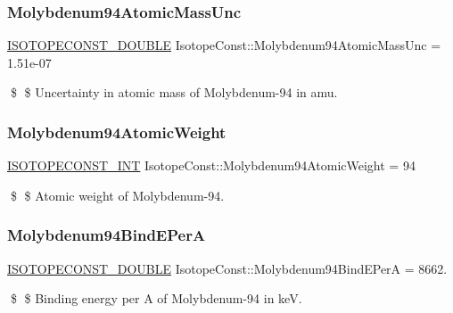 \subsubsection{\texorpdfstring{Molybdenum94\+Atomic\+Mass\+Unc}{Molybdenum94AtomicMassUnc}}
{\footnotesize\ttfamily \mbox{\hyperlink{group___isotope_const-_macros_ga8f45a7272ce02c0b4c65c44636ed719a}{I\+S\+O\+T\+O\+P\+E\+C\+O\+N\+S\+T\+\_\+\+D\+O\+U\+B\+LE}} Isotope\+Const\+::\+Molybdenum94\+Atomic\+Mass\+Unc = 1.\+51e-\/07}

\$ \$ Uncertainty in atomic mass of Molybdenum-\/94 in amu. \mbox{\label{group___isotope_const-_molybdenum-_mo94_gacb2aad8bd37fd304afffdd239c3c7a1e}} 
\subsubsection{\texorpdfstring{Molybdenum94\+Atomic\+Weight}{Molybdenum94AtomicWeight}}
{\footnotesize\ttfamily \mbox{\hyperlink{group___isotope_const-_macros_ga5f18360b3e99483a35c32d789e62621c}{I\+S\+O\+T\+O\+P\+E\+C\+O\+N\+S\+T\+\_\+\+I\+NT}} Isotope\+Const\+::\+Molybdenum94\+Atomic\+Weight = 94}

\$ \$ Atomic weight of Molybdenum-\/94. \mbox{\label{group___isotope_const-_molybdenum-_mo94_ga1bac72eaa998232dde040b72ffa74011}} 
\subsubsection{\texorpdfstring{Molybdenum94\+Bind\+E\+PerA}{Molybdenum94BindEPerA}}
{\footnotesize\ttfamily \mbox{\hyperlink{group___isotope_const-_macros_ga8f45a7272ce02c0b4c65c44636ed719a}{I\+S\+O\+T\+O\+P\+E\+C\+O\+N\+S\+T\+\_\+\+D\+O\+U\+B\+LE}} Isotope\+Const\+::\+Molybdenum94\+Bind\+E\+PerA = 8662.}

\$ \$ Binding energy per A of Molybdenum-\/94 in keV. \mbox{\label{group___isotope_const-_molybdenum-_mo94_ga55f9083b17ff7846247918701ca303b6}} 

